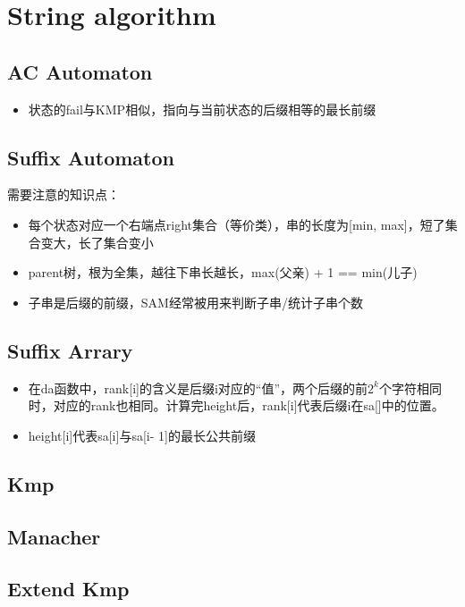 \section{String algorithm}
	\subsection{AC Automaton}
		\begin{itemize}
			\item 状态的fail与KMP相似，指向与当前状态的后缀相等的最长前缀
		\end{itemize}
		
	\subsection{Suffix Automaton}
		\begin{flushleft}
			需要注意的知识点：
			\begin{itemize}
				\item 每个状态对应一个右端点right集合（等价类），串的长度为[min, max]，短了集合变大，长了集合变小
				\item parent树，根为全集，越往下串长越长，max(父亲) + 1 == min(儿子)
				\item 子串是后缀的前缀，SAM经常被用来判断子串/统计子串个数
			\end{itemize}
		\end{flushleft}
		
	\subsection{Suffix Arrary}
		\begin{flushleft}
			\begin{itemize}
				\item 在da函数中，rank[i]的含义是后缀i对应的“值”，两个后缀的前$2^k$个字符相同时，对应的rank也相同。计算完height后，rank[i]代表后缀i在sa[]中的位置。
				\item height[i]代表sa[i]与sa[i- 1]的最长公共前缀
			\end{itemize}
		\end{flushleft}
		
	\subsection{Kmp}
		
	\subsection{Manacher}
		
	\subsection{Extend Kmp}
		
